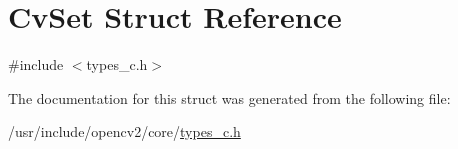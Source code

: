 \hypertarget{structCvSet}{\section{Cv\-Set Struct Reference}
\label{structCvSet}
}


{\ttfamily \#include $<$types\-\_\-c.\-h$>$}



The documentation for this struct was generated from the following file\-:\begin{DoxyCompactItemize}
\item 
/usr/include/opencv2/core/\hyperlink{core_2types__c_8h}{types\-\_\-c.\-h}\end{DoxyCompactItemize}
